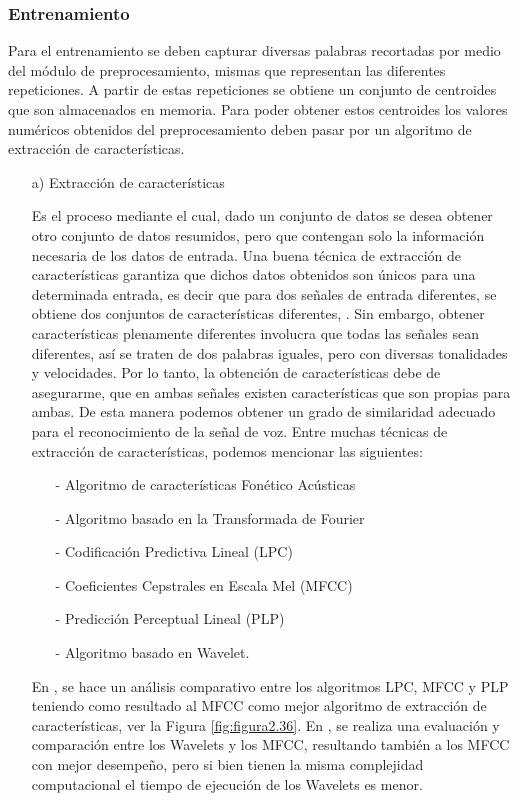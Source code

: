 \subsubsection{Entrenamiento}
Para el entrenamiento se deben capturar diversas palabras recortadas por medio del módulo de preprocesamiento, mismas que representan las diferentes repeticiones. A partir de estas repeticiones se obtiene un conjunto de centroides que son almacenados en memoria. Para poder obtener estos centroides los valores numéricos obtenidos del preprocesamiento deben pasar por un algoritmo de extracción de características.
\begin{enumerate}
\item[a)]Extracción de características
\par
Es el proceso mediante el cual, dado un conjunto de datos se desea obtener otro conjunto de datos resumidos, pero que contengan solo la información necesaria de los datos de entrada. Una buena técnica de extracción de características garantiza que dichos datos obtenidos son únicos para una determinada entrada, es decir que para dos señales de entrada diferentes, se obtiene dos conjuntos de características diferentes, \cite{claudio}.
\vskip 0.5cm
Sin embargo, obtener características plenamente diferentes involucra que todas las señales sean diferentes, así se traten de dos palabras iguales, pero con diversas tonalidades y velocidades. Por lo tanto, la obtención de características debe de asegurarme, que en ambas señales existen características que son propias para ambas. De esta manera podemos obtener un grado de similaridad adecuado para el reconocimiento de la señal de voz.
\vskip 0.5cm
Entre muchas técnicas de extracción de características, podemos mencionar las siguientes:
\begin{enumerate}
\item[-]Algoritmo de características Fonético Acústicas
\item[-]Algoritmo basado en la Transformada de Fourier
\item[-]Codificación Predictiva Lineal (LPC)
\item[-]Coeficientes Cepstrales en Escala Mel (MFCC)
\item[-]Predicción Perceptual Lineal (PLP)
\item[-]Algoritmo basado en Wavelet.
\end{enumerate}

En \citep{unam}, se hace un análisis comparativo entre los algoritmos LPC, MFCC y PLP teniendo como resultado al MFCC como mejor algoritmo de extracción de características, ver la Figura \ref{fig:figura2.36}. En \citep{orlando}, se realiza una evaluación y comparación entre los Wavelets y los MFCC, resultando también a los MFCC con mejor desempeño, pero si bien tienen la misma complejidad computacional el tiempo de ejecución de los Wavelets es menor.


\end{enumerate}
